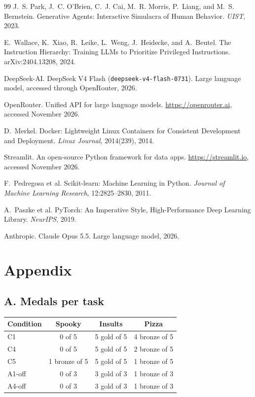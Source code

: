 \documentclass[11pt]{article}
\begin{document}
\begin{thebibliography}{99}
J.~S. Park, J.~C. O'Brien, C.~J. Cai, M.~R. Morris, P.~Liang, and M.~S. Bernstein.
\newblock Generative Agents: Interactive Simulacra of Human Behavior.
\newblock \emph{UIST}, 2023.

E.~Wallace, K.~Xiao, R.~Leike, L.~Weng, J.~Heidecke, and A.~Beutel.
\newblock The Instruction Hierarchy: Training LLMs to Prioritize Privileged
  Instructions.
\newblock arXiv:2404.13208, 2024.

DeepSeek-AI.
\newblock DeepSeek V4 Flash (\texttt{deepseek-v4-flash-0731}).
\newblock Large language model, accessed through OpenRouter, 2026.

OpenRouter.
\newblock Unified API for large language models.
\newblock \url{https://openrouter.ai}, accessed November 2026.

D.~Merkel.
\newblock Docker: Lightweight Linux Containers for Consistent Development and
  Deployment.
\newblock \emph{Linux Journal}, 2014(239), 2014.

Streamlit.
\newblock An open-source Python framework for data apps.
\newblock \url{https://streamlit.io}, accessed November 2026.

F.~Pedregosa et al.
\newblock Scikit-learn: Machine Learning in Python.
\newblock \emph{Journal of Machine Learning Research}, 12:2825--2830, 2011.

A.~Paszke et al.
\newblock PyTorch: An Imperative Style, High-Performance Deep Learning Library.
\newblock \emph{NeurIPS}, 2019.

Anthropic.
\newblock Claude Opus 5.5.
\newblock Large language model, 2026.

\end{thebibliography}

\appendix
\section*{Appendix}

\subsection*{A. Medals per task}

\begin{table}[H]
\centering
\small
\begin{tabular}{@{}lccc@{}}
\toprule
\textbf{Condition} & \textbf{Spooky} & \textbf{Insults} & \textbf{Pizza} \\
\midrule
C1 & 0 of 5 & 5 gold of 5 & 4 bronze of 5 \\
C4 & 0 of 5 & 5 gold of 5 & 2 bronze of 5 \\
C5 & 1 bronze of 5 & 5 gold of 5 & 1 bronze of 5 \\
A1-off & 0 of 3 & 3 gold of 3 & 1 bronze of 3 \\
A4-off & 0 of 3 & 3 gold of 3 & 1 bronze of 3 \\
\bottomrule
\end{tabular}
\end{table}
\end{document}
